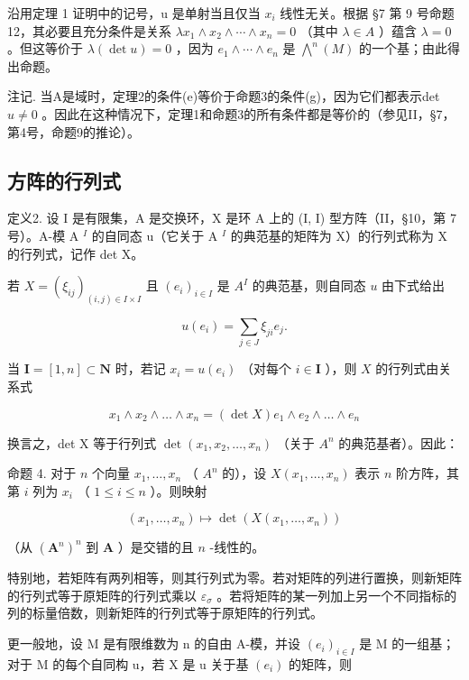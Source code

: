 沿用定理 1 证明中的记号，u 是单射当且仅当 \(x_{i}\) 线性无关。根据 §7 第 9 号命题 12，其必要且充分条件是关系 \(\lambda x_{1} \wedge x_{2} \wedge \cdots \wedge x_{n} = 0\) （其中 \(\lambda \in A\) ）蕴含 \(\lambda = 0\) 。但这等价于 \(\lambda(\det u) = 0\) ，因为 \(e_{1} \wedge \cdots \wedge e_{n}\) 是 \(\bigwedge^{n}(M)\) 的一个基；由此得出命题。

注记. 当A是域时，定理2的条件(e)等价于命题3的条件(g)，因为它们都表示det \(u \neq 0\) 。因此在这种情况下，定理1和命题3的所有条件都是等价的（参见II，§7，第4号，命题9的推论）。

\subsection{方阵的行列式}

定义2. 设 I 是有限集，A 是交换环，X 是环 A 上的 (I, I) 型方阵（II，§10，第 7 号）。A-模 A \(^{I}\) 的自同态 u（它关于 A \(^{I}\) 的典范基的矩阵为 X）的行列式称为 X 的行列式，记作 det X。

若 \(X = (\xi_{ij})_{(i,j) \in I \times I}\) 且 \((e_i)_{i \in I}\) 是 \(A^I\) 的典范基，则自同态 \(u\) 由下式给出

\[
u (e _ {i}) = \sum_ {j \in J} \xi_ {j i} e _ {j}.
\]

当 \(\mathbf{I} = [1, n] \subset \mathbf{N}\) 时，若记 \(x_{i} = u(e_{i})\) （对每个 \(i \in \mathbf{I}\) ），则 \(X\) 的行列式由关系式

\[
x _ {1} \wedge x _ {2} \wedge \dots \wedge x _ {n} = (\det X) e _ {1} \wedge e _ {2} \wedge \dots \wedge e _ {n}\tag{6}
\]

换言之，det X 等于行列式 \(\det(x_{1}, x_{2}, \ldots, x_{n})\) （关于 \(A^{n}\) 的典范基者）。因此：

命题 4. 对于 \(n\) 个向量 \(x_1, \ldots, x_n\) （ \(A^n\) 的），设 \(X(x_1, \ldots, x_n)\) 表示 \(n\) 阶方阵，其第 \(i\) 列为 \(x_i\) （ \(1 \leqslant i \leqslant n\) ）。则映射

\[
(x _ {1}, \dots , x _ {n}) \mapsto \det (X (x _ {1}, \dots , x _ {n}))
\]

（从 \((\mathbf{A}^n)^n\) 到 \(\mathbf{A}\) ）是交错的且 \(n\) -线性的。

特别地，若矩阵有两列相等，则其行列式为零。若对矩阵的列进行置换，则新矩阵的行列式等于原矩阵的行列式乘以 \(\varepsilon_{\sigma}\) 。若将矩阵的某一列加上另一个不同指标的列的标量倍数，则新矩阵的行列式等于原矩阵的行列式。

更一般地，设 M 是有限维数为 n 的自由 A-模，并设 \((e_{i})_{i\in I}\) 是 M 的一组基；对于 M 的每个自同构 u，若 X 是 u 关于基 \((e_{i})\) 的矩阵，则

